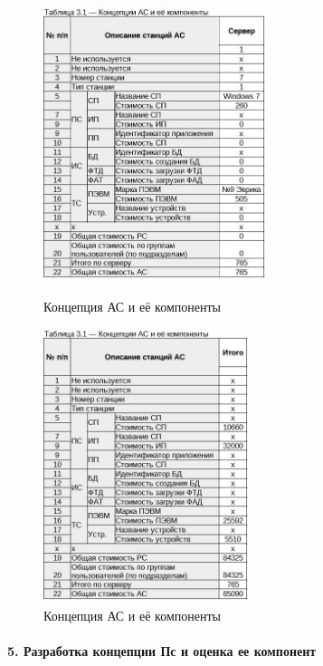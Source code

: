 \documentclass[12pt, a4paper, simple]{eskdtext}
\begin{document}
    \begin{figure}[!hp]
        \begin{minipage}{0.48\textwidth}
            \centering
            \includegraphics[height=8cm]
            {_docs/Таблица3-1КонцепцияАСИЕеКомпонентыСС1.jpg}
            \caption{Концепция АС и её компоненты}
        \end{minipage}
        \begin{minipage}{0.48\textwidth}
            \centering
            \includegraphics[height=8cm]
            {_docs/Таблица3-1КонцепцияАСИЕеКомпоненты.jpg}
            \caption{Концепция АС и её компоненты}
        \end{minipage}
     \end{figure}
    
    \newpage

    \paragraph{5. Разработка концепции Пс и оценка ее компонент} \hspace{0pt}
\end{document}
